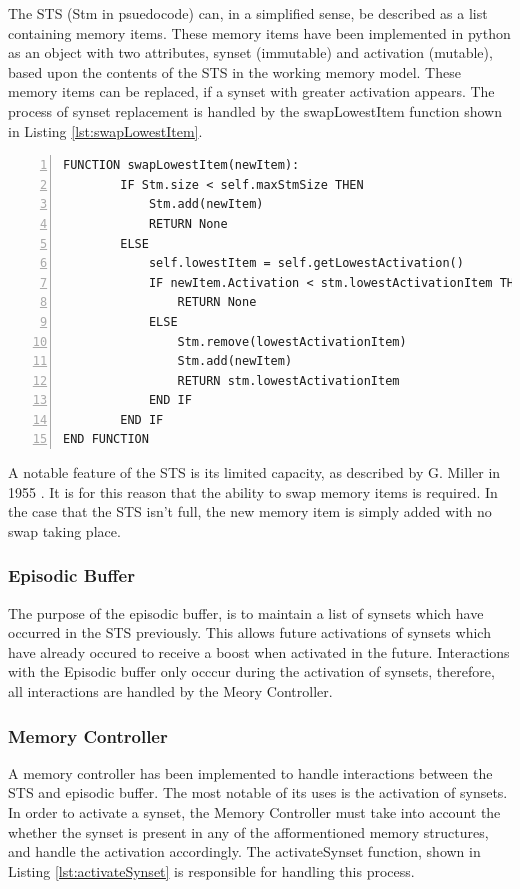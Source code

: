 \documentclass[]{article}
\begin{document}
The STS (Stm in psuedocode) can, in a simplified sense, be described as a list containing memory items. These memory items have been implemented in python as an object with two attributes, synset (immutable) and activation (mutable), based upon the contents of the STS in the working memory model. These memory items can be replaced, if a synset with greater activation appears. The process of synset replacement is handled by the swapLowestItem function shown in Listing \ref{lst:swapLowestItem}.

\begin{lstlisting}[numbers=left, numberstyle=\small, caption={the swapLowestItem function}, captionpos=b, label={lst:swapLowestItem}]
FUNCTION swapLowestItem(newItem):
        IF Stm.size < self.maxStmSize THEN
            Stm.add(newItem)
            RETURN None
        ELSE
            self.lowestItem = self.getLowestActivation()
            IF newItem.Activation < stm.lowestActivationItem THEN
                RETURN None
            ELSE
                Stm.remove(lowestActivationItem)
                Stm.add(newItem)
                RETURN stm.lowestActivationItem
            END IF
        END IF
END FUNCTION
\end{lstlisting}

A notable feature of the STS is its limited capacity, as described by G. Miller in 1955 \cite{SevenPlusMinusTwo}. It is for this reason that the ability to swap memory items is required. In the case that the STS isn't full, the new memory item is simply added with no swap taking place.

\subsubsection{Episodic Buffer}
\label{sec:ImplementedEpisodicBuffer}

The purpose of the episodic buffer, is to maintain a list of synsets which have occurred in the STS previously. This allows future activations of synsets which have already occured to receive a boost when activated in the future. Interactions with the Episodic buffer only occcur during the activation of synsets, therefore, all interactions are handled by the Meory Controller.

\subsubsection{Memory Controller}
\label{sec:ImplementedMemoryController}

A memory controller has been implemented to handle interactions between the STS and episodic buffer. The most notable of its uses is the activation of synsets. In order to activate a synset, the Memory Controller must take into account the whether the synset is present in any of the afformentioned memory structures, and handle the activation accordingly. The activateSynset function, shown in Listing \ref{lst:activateSynset} is responsible for handling this process.
\end{document}

